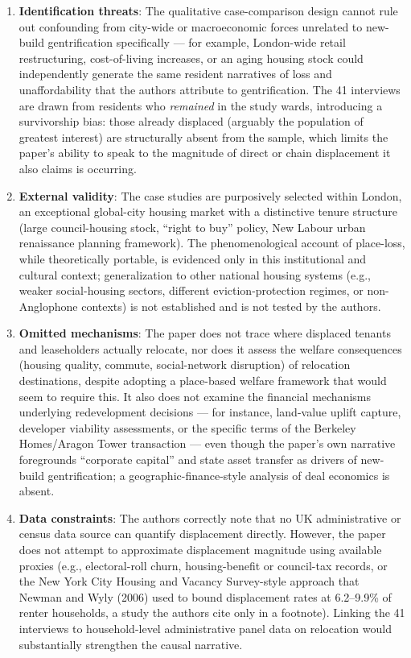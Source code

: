 \begin{enumerate}
  \item \textbf{Identification threats}: The qualitative case-comparison design cannot rule out confounding from city-wide or macroeconomic forces unrelated to new-build gentrification specifically --- for example, London-wide retail restructuring, cost-of-living increases, or an aging housing stock could independently generate the same resident narratives of loss and unaffordability that the authors attribute to gentrification. The 41 interviews are drawn from residents who \emph{remained} in the study wards, introducing a survivorship bias: those already displaced (arguably the population of greatest interest) are structurally absent from the sample, which limits the paper's ability to speak to the magnitude of direct or chain displacement it also claims is occurring.
  \item \textbf{External validity}: The case studies are purposively selected within London, an exceptional global-city housing market with a distinctive tenure structure (large council-housing stock, ``right to buy'' policy, New Labour urban renaissance planning framework). The phenomenological account of place-loss, while theoretically portable, is evidenced only in this institutional and cultural context; generalization to other national housing systems (e.g., weaker social-housing sectors, different eviction-protection regimes, or non-Anglophone contexts) is not established and is not tested by the authors.
  \item \textbf{Omitted mechanisms}: The paper does not trace where displaced tenants and leaseholders actually relocate, nor does it assess the welfare consequences (housing quality, commute, social-network disruption) of relocation destinations, despite adopting a place-based welfare framework that would seem to require this. It also does not examine the financial mechanisms underlying redevelopment decisions --- for instance, land-value uplift capture, developer viability assessments, or the specific terms of the Berkeley Homes/Aragon Tower transaction --- even though the paper's own narrative foregrounds ``corporate capital'' and state asset transfer as drivers of new-build gentrification; a geographic-finance-style analysis of deal economics is absent.
  \item \textbf{Data constraints}: The authors correctly note that no UK administrative or census data source can quantify displacement directly. However, the paper does not attempt to approximate displacement magnitude using available proxies (e.g., electoral-roll churn, housing-benefit or council-tax records, or the New York City Housing and Vacancy Survey-style approach that Newman and Wyly (2006) used to bound displacement rates at 6.2--9.9\% of renter households, a study the authors cite only in a footnote). Linking the 41 interviews to household-level administrative panel data on relocation would substantially strengthen the causal narrative.

\end{enumerate}
